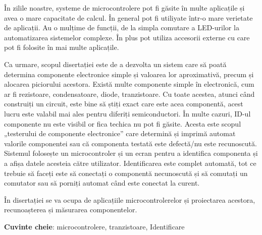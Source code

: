 În zilile noastre, systeme de microcontrolere pot fi găsite în multe aplicațile
și avea o mare capacitate de calcul. În general pot fi utiliyate într-o
mare verietate de aplicații. Au o mulțime de funcții, de la simpla comutare 
a LED-urilor la automatizarea sistemelor complexe.
În plus pot utiliza accesorii externe cu care pot fi folosite în
mai multe aplicațile.

Ca urmare, scopul disertației este de a dezvolta un sistem care să poată 
determina componente electronice simple și valoarea lor aproximativă, 
precum și alocarea piciorului acestora.
Există multe componente simple în electronică, cum ar fi rezistoare, 
condensatoare, diode, tranzistoare.
Cu toate acestea, atunci când construiți un circuit, este bine să știți 
exact care este acea componentă, acest lucru este valabil mai ales pentru 
diferiți semiconductori.
În multe cazuri, ID-ul componente nu este visibil or fica techica
nu pot fi găsite.
Acesta este scopul „testerului de componente electronice” care determină și 
imprimă automat valorile componentei sau că componenta testată este defectă/nu 
este recunoscută.
Sistemul folosește un microcontroler și un ecran pentru a identifica 
componenta și a afișa datele acesteia către utilizator.
Identificarea este complet automată, tot ce trebuie să faceți este să 
conectați o componentă necunoscută și să comutați un comutator sau să 
porniți automat când este conectat la curent.

În disertației se va ocupa de aplicațiile microcontrolerelor și proiectarea acestora, 
recunoașterea și măsurarea componentelor.

\textbf{Cuvinte cheie}: microcontrolere, tranzistoare, Identificare

